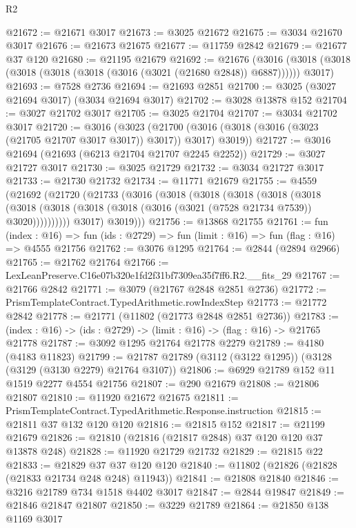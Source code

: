 \begin{lexlean}{R2}
\begin{coremodule}
@21672 := @21671 @3017
@21673 := @3025 @21672
@21675 := @3034 @21670 @3017
@21676 := @21673 @21675
@21677 := @11759 @2842
@21679 := @21677 @37 @120
@21680 := @21195 @21679
@21692 := @21676
    (@3016 (@3018 (@3018 (@3018 (@3018 (@3018 (@3016 (@3021 (@21680 @2848)) @6887)))))) @3017)
@21693 := @7528 @2736
@21694 := @21693 @2851
@21700 := @3025 (@3027 @21694 @3017) (@3034 @21694 @3017)
@21702 := @3028 @13878 @152
@21704 := @3027 @21702 @3017
@21705 := @3025 @21704
@21707 := @3034 @21702 @3017
@21720 := @3016
    (@3023 (@21700 (@3016 (@3018 (@3016 (@3023 (@21705 @21707 @3017 @3017)) @3017)) @3017) @3019))
@21727 := @3016 @21694 (@21693 (@6213 @21704 @21707 @2245 @2252))
@21729 := @3027 @21727 @3017
@21730 := @3025 @21729
@21732 := @3034 @21727 @3017
@21733 := @21730 @21732
@21734 := @11771 @21679
@21755 := @4559
    (@21692
      (@21720
        (@21733
          (@3016
            (@3018
              (@3018
                (@3018
                  (@3018
                    (@3018
                      (@3018
                        (@3018 (@3018 (@3018 (@3016 (@3021 (@7528 @21734 @7539)) @3020))))))))))
            @3017)
          @3019)))
@21756 := @13868 @21755
@21761 := fun (index : @16) =>
  fun (ids : @2729) => fun (limit : @16) => fun (flag : @16) => @4555 @21756
@21762 := @3076 @1295
@21764 := @2844 (@2894 @2966)
@21765 := @21762 @21764
@21766 := LexLeanPreserve.C16e07b320e1fd2f31bf7309ea35f7ff6.R2.__fits_29
@21767 := @21766 @2842
@21771 := @3079 (@21767 @2848 @2851 @2736)
@21772 := PrismTemplateContract.TypedArithmetic.rowIndexStep
@21773 := @21772 @2842
@21778 := @21771 (@11802 (@21773 @2848 @2851 @2736))
@21783 := (index : @16) -> (ids : @2729) -> (limit : @16) -> (flag : @16) -> @21765 @21778
@21787 := @3092 @1295 @21764 @21778 @2279
@21789 := @4180 (@4183 @11823)
@21799 := @21787 @21789 (@3112 (@3122 @1295)) (@3128 (@3129 (@3130 @2279) @21764 @3107))
@21806 := @6929 @21789 @152 @11 @1519 @2277 @4554 @21756
@21807 := @290 @21679
@21808 := @21806 @21807
@21810 := @11920 @21672 @21675
@21811 := PrismTemplateContract.TypedArithmetic.Response.instruction
@21815 := @21811 @37 @132 @120 @120
@21816 := @21815 @152
@21817 := @21199 @21679
@21826 := @21810 (@21816 (@21817 @2848) @37 @120 @120 @37 @13878 @248)
@21828 := @11920 @21729 @21732
@21829 := @21815 @22
@21833 := @21829 @37 @37 @120 @120
@21840 := @11802 (@21826 (@21828 (@21833 @21734 @248 @248) @11943))
@21841 := @21808 @21840
@21846 := @3216 @21789 @734 @1518 @4402 @3017
@21847 := @2844 @19847
@21849 := @21846 @21847 @21807
@21850 := @3229 @21789
@21864 := @21850
    @138
    @1169
    @3017

\end{coremodule}
\end{lexlean}
